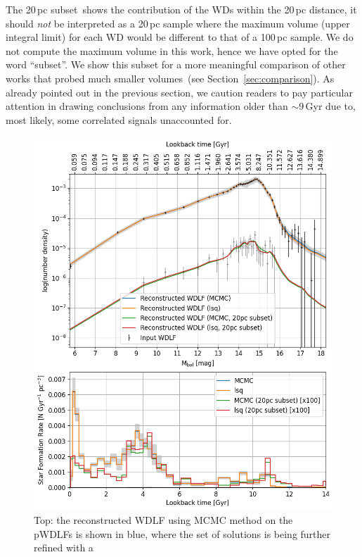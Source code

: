 \documentclass[fleqn,usenatbib]{mnras}
\begin{document}
The 20\,pc subset\ shows the contribution of the WDs within the 20\,pc distance,
it should \textit{not} be interpreted as a 20\,pc sample where the maximum
volume (upper integral limit) for each WD would be different to that of a
100\,pc sample. We do not compute the maximum volume in this work, hence we have
opted for the word ``subset''. We show this subset for a more
meaningful comparison of other works that probed much smaller volumes~(see 
Section~\ref{sec:comparison}). As already pointed out in the previous section,
we caution readers to pay particular attention in drawing conclusions from any 
information older than $\sim$$9$\,Gyr due to, most likely, some correlated
signals unaccounted for.

\begin{figure}
    \includegraphics[width=
    \columnwidth]{figures/fig_05_gcns_reconstructed_wdlf_optimal_resolution_bin_optimal.png}
    \caption{Top: the reconstructed WDLF using MCMC method on the pWDLFs is
    shown in blue, where the set of solutions is being further refined with a
}
\end{figure}
\end{document}

